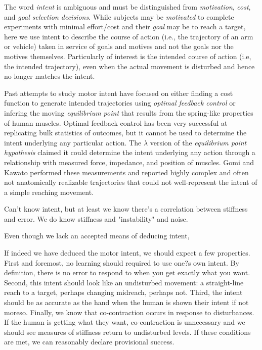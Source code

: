 \documentclass[letterpaper, 10 pt, conference]{ieeeconf}  %
\begin{document}
The word \textit{intent} is ambiguous and must be distinguished from \textit{motivation}\cite{mcclelland1985motives, rawolle2013relationships}, \textit{cost}\cite{todorov2002optimal, flash1985coordination}, and \textit{goal selection decisions}\cite{ziebart2010modeling}. While subjects may be \textit{motivated} to complete experiments with minimal effort/cost and their \textit{goal} may be to reach a target, here we use intent to describe the course of action (i.e., the trajectory of an arm or vehicle) taken in service of goals and motives and not the goals nor the motives themselves. Particularly of interest is the intended course of action (i.e, the intended trajectory), even when the actual movement is disturbed and hence no longer matches the intent.

Past attempts to study motor intent have focused on either finding a cost function to generate intended trajectories using \textit{optimal feedback control} or infering the moving \textit{equilibrium point} that results from the spring-like properties of human muscles. Optimal feedback control has been very successful at replicating bulk statistics of outcomes, but it cannot be used to determine the intent underlying any particular action. The $\lambda$ version of the \textit{equilibrium point hypothesis} claimed it could determine the intent underlying any action through a relationship with measured force, impedance, and position of muscles. Gomi and Kawato\cite{gomi1997human} performed these measurements and reported highly complex and often not anatomically realizable trajectories that could not well-represent the intent of a simple reaching movement.

Can't know intent, but at least we know there's a correlation between stiffness and error. We do know stiffness and "instability" and noise.

Even though we lack an accepted means of deducing intent, 

If indeed we have deduced the motor intent, we should expect a few properties. First and foremost, no learning should required to use one?s own intent. By definition, there is no error to respond to when you get exactly what you want. Second, this intent should look like an undisturbed movement: a straight-line reach to a target, perhaps changing midreach, perhaps not. Third, the intent should be as accurate as the hand when the human is shown their intent if not moreso. Finally, we know that co-contraction occurs in response to disturbances. If the human is getting what they want, co-contraction is unnecessary and we should see measures of stiffness return to undisturbed levels. If these conditions are met, we can reasonably declare provisional success.
\end{document}
